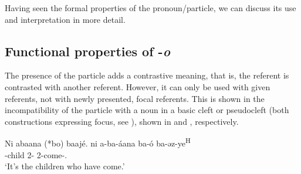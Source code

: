 \documentclass[output=paper]{langscibook}
\begin{document}
\ea
\label{bkm:Ref78532151}
\begin{xlist}[B$'$:]


\end{xlist}
\z

Having seen the formal properties of the pronoun/particle, we can discuss its use and interpretation in more detail.

\subsection{Functional properties of -\textit{o}}

The presence of the particle adds a contrastive meaning, that is, the referent is contrasted with another referent. However, it can only be used with given referents, not with newly presented, focal referents. This is shown in the incompatibility of the particle with a noun in a basic cleft or pseudocleft (both constructions expressing focus, see ), shown in  and , respectively.\pagebreak

\ea
\label{bkm:Ref75175945}
Ni abaana (*bo) baajé.  
\gll
ni  a-ba-áana  ba-ó  ba-əz-ye\textsuperscript{H}\\
\COP{}  -child  2-\CM{}  2\SM{}-come-\PFV.\REL{}\\
\glt
‘It’s the children who have come.’\\

\z
\end{document}
